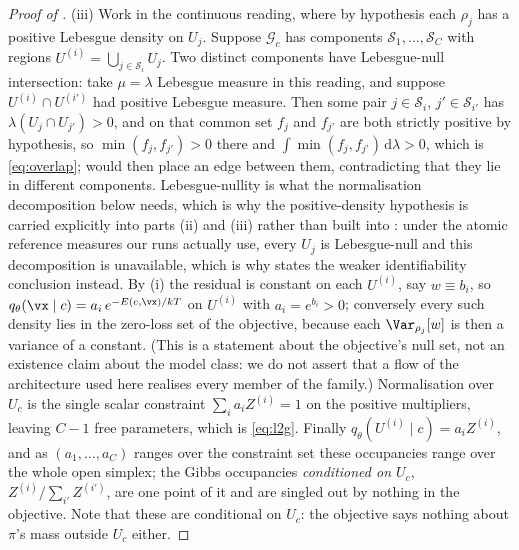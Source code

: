 \begin{proof}[Proof of ]
(iii) Work in the continuous reading, where by hypothesis each $\rho_j$ has a
positive Lebesgue density on $U_j$. Suppose $\mathcal{G}_c$ has components
$\mathcal{S}_1,\dots,\mathcal{S}_C$ with regions
$U^{(i)} = \bigcup_{j \in \mathcal{S}_i} U_j$. Two distinct
components have Lebesgue-null intersection: take $\mu = \lambda$ Lebesgue measure in
this reading, and suppose $U^{(i)} \cap U^{(i')}$ had positive Lebesgue measure.
Then some pair $j \in \mathcal{S}_i$, $j' \in \mathcal{S}_{i'}$ has
$\lambda(U_j \cap U_{j'}) > 0$, and on that common set $f_j$ and $f_{j'}$ are both
strictly positive by hypothesis, so $\min(f_j,f_{j'}) > 0$ there and
$\int \min(f_j,f_{j'})\,\mathrm{d}\lambda > 0$, which is \eqref{eq:overlap};
 would then place an edge between them, contradicting that they
lie in different components. Lebesgue-nullity is what the
normalisation decomposition below needs, which is why the positive-density
hypothesis is carried explicitly into parts (ii) and (iii) rather than built into
: under the atomic reference measures our runs actually use,
every $U_j$ is Lebesgue-null and this decomposition is unavailable, which is why
 states the weaker identifiability conclusion instead. By (i) the
residual is constant on each $U^{(i)}$, say $w \equiv b_i$, so
$q_\theta(\vx\mid c) = a_i\,e^{-E(c,\vx)/kT}$ on $U^{(i)}$ with $a_i = e^{b_i} > 0$;
conversely every such density lies in the zero-loss set of the objective, because
each $\Var_{\rho_j}[w]$ is then a variance of a constant. (This is a statement about
the objective's null set, not an existence claim about the model class: we do not
assert that a flow of the architecture used here realises every member of the
family.) Normalisation over $U_c$ is the single scalar constraint
$\sum_i a_i Z^{(i)} = 1$ on the positive multipliers, leaving $C-1$ free parameters,
which is \eqref{eq:l2g}. Finally $q_\theta(U^{(i)}\mid c) = a_i Z^{(i)}$, and as
$(a_1,\dots,a_C)$ ranges over the constraint set these occupancies range over the
whole open simplex; the Gibbs occupancies \emph{conditioned on $U_c$},
$Z^{(i)}/\sum_{i'}Z^{(i')}$, are one point of it and are singled out by nothing in
the objective. Note that these are conditional on $U_c$: the objective says nothing
about $\pi$'s mass outside $U_c$ either.
\end{proof}

